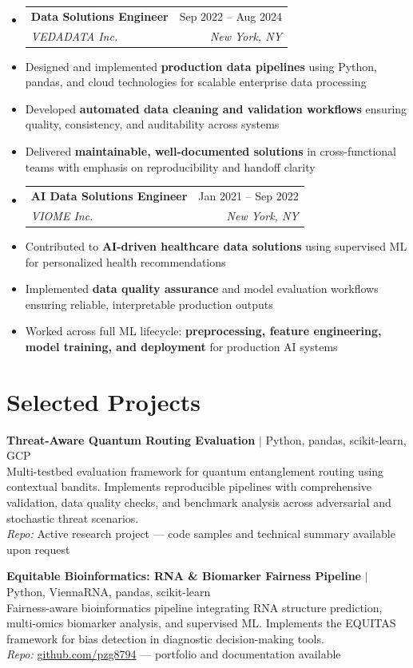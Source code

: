 \documentclass[10pt]{article}
\makeatletter
\newcommand{\resumeItem}[1]{\item\small{#1}}
\newcommand{\resumeSubheading}[4]{
  \vspace{-1pt}\item
  \begin{tabular*}{0.97\textwidth}[t]{l@{\extracolsep{\fill}}r}
    \textbf{#1} & #2 \\
    \textit{\small#3} & \textit{\small #4} \\
  \end{tabular*}\vspace{-5pt}
}
\makeatother
\begin{document}
\begin{itemize}[leftmargin=*,label={}]
  \vspace{4pt}
  \resumeSubheading
    {Data Solutions Engineer}{Sep 2022 -- Aug 2024}
    {VEDADATA Inc.}{New York, NY}
    \resumeItem{Designed and implemented \textbf{production data pipelines} using Python, pandas, and cloud technologies for scalable enterprise data processing}
    \resumeItem{Developed \textbf{automated data cleaning and validation workflows} ensuring quality, consistency, and auditability across systems}
    \resumeItem{Delivered \textbf{maintainable, well-documented solutions} in cross-functional teams with emphasis on reproducibility and handoff clarity}

  \vspace{4pt}
  \resumeSubheading
    {AI Data Solutions Engineer}{Jan 2021 -- Sep 2022}
    {VIOME Inc.}{New York, NY}
    \resumeItem{Contributed to \textbf{AI-driven healthcare data solutions} using supervised ML for personalized health recommendations}
    \resumeItem{Implemented \textbf{data quality assurance} and model evaluation workflows ensuring reliable, interpretable production outputs}
    \resumeItem{Worked across full ML lifecycle: \textbf{preprocessing, feature engineering, model training, and deployment} for production AI systems}
\end{itemize}


\section{Selected Projects}

\textbf{Threat-Aware Quantum Routing Evaluation} $|$ Python, pandas, scikit-learn, GCP \\
Multi-testbed evaluation framework for quantum entanglement routing using contextual bandits. Implements reproducible pipelines with comprehensive validation, data quality checks, and benchmark analysis across adversarial and stochastic threat scenarios. \\
\textit{Repo:} Active research project --- code samples and technical summary available upon request

\vspace{4pt}
\textbf{Equitable Bioinformatics: RNA \& Biomarker Fairness Pipeline} $|$ Python, ViennaRNA, pandas, scikit-learn \\
Fairness-aware bioinformatics pipeline integrating RNA structure prediction, multi-omics biomarker analysis, and supervised ML. Implements the EQUITAS framework for bias detection in diagnostic decision-making tools. \\
\textit{Repo:} \href{https://github.com/pzg8794}{github.com/pzg8794} --- portfolio and documentation available
\end{document}
